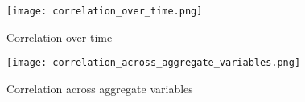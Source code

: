 
\begin{figure}[H]
\centering
\texttt{[image: correlation\_over\_time.png]}
\caption{Correlation over time}
\label{correlation_over_time.png}
\end{figure}


\begin{figure}[H]
\centering
\texttt{[image: correlation\_across\_aggregate\_variables.png]}
\caption{Correlation across aggregate variables}
\label{correlation_across_aggregate_variables.png}
\end{figure}




